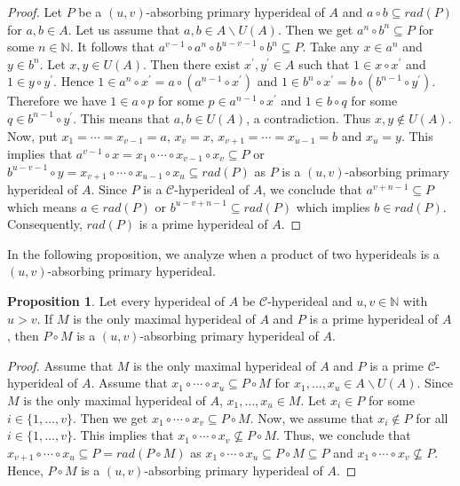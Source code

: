 \documentclass[preprint,review,10pt]{amsart}
\theoremstyle{definition}
\newtheorem{proposition}[theorem]{Proposition}
\theoremstyle{remark}
\numberwithin{equation}{section}
\begin{document}
\begin{proof}
Let $P$ be a $(u,v)$-absorbing primary hyperideal of $A$ and $a \circ b \subseteq rad(P)$ for $a,b \in A$. Let us assume that $a,b \in A\backslash U(A)$. Then we get $a^n \circ b^n \subseteq P$ for some $n \in \mathbb{N}$. It follows that  $a^{v-1} \circ a^n \circ b^{u-v-1} \circ b^n \subseteq P$. Take any $x \in a^n$ and $y \in b^n$. Let $x, y \in U(A)$. Then there exist $x^{\prime}, y^{\prime} \in A$ such that $1 \in x \circ x^{\prime}$ and $1 \in y \circ y^{\prime}$. Hence $1 \in a^n \circ x^{\prime}=a \circ (a^{n-1} \circ x^{\prime})$ and $1 \in b^n \circ x^{\prime}=b \circ (b^{n-1} \circ y^{\prime})$. Therefore we  have $1 \in a \circ p$ for some $p \in a^{n-1} \circ x^{\prime}$ and $1 \in b \circ q$ for some $q \in b^{n-1} \circ y^{\prime}$. This means that $a,b \in U(A)$, a contradiction.  Thus $x,y \notin U(A)$. Now, put $x_1=\cdots=x_{v-1}=a$, $x_v=x$, $x_{v+1}=\cdots=x_{u-1}=b$ and $x_u=y$. This implies that $a^{v-1} \circ x=x_1 \circ \cdots \circ x_{v-1} \circ x_v \subseteq P$ or $b^{u-v-1} \circ y=x_{v+1} \circ \cdots \circ x_{u-1} \circ x_u \subseteq rad(P)$ as $P$ is a $(u,v)$-absorbing primary hyperideal of $A$. Since $P$ is a $\mathcal{C}$-hyperideal of $A$,  we conclude that $a^{v+n-1} \subseteq P$ which means $a \in rad(P)$ or $b^{u-v+n-1} \subseteq rad(P)$ which implies $b \in rad(P)$. Consequently, $rad(P)$ is a prime hyperideal of $A$.
\end{proof}
In the following proposition, we analyze when a product of two hyperideals is a $(u,v)$-absorbing primary hyperideal.
\begin{proposition} \label{2}
Let every hyperideal of $A$ be $\mathcal{C}$-hyperideal and $u,v \in \mathbb{N}$ with $u >v$. If $M$ is the only maximal hyperideal of $A$ and $P$ is a prime hyperideal of $A$, then $P \circ M $ is a $(u,v)$-absorbing primary hyperideal of $A$. 
\end{proposition}
\begin{proof}
Assume that $M$ is the only maximal hyperideal of $A$ and $P$ is  a prime $\mathcal{C}$-hyperideal of $A$. Assume that $x_1 \circ \cdots \circ x_u \subseteq P \circ M$ for $x_1,\ldots,x_u \in A \backslash U(A)$. Since $M$ is the only maximal hyperideal of $A$, $x_1,\ldots,x_u \in M$. Let $x_i \in P$ for some $i \in \{1,\ldots,v\}$. Then we get $x_1 \circ \cdots \circ x_v \subseteq P \circ M$. Now, we assume that $x_i \notin P$ for all $i \in \{1,\ldots,v\}$. This implies that $x_1 \circ \cdots \circ x_v \nsubseteq P \circ M$. Thus, we conclude that $x_{v+1} \circ \cdots \circ x_u \subseteq P =rad(P\circ M)$ as  $x_1 \circ \cdots \circ x_u \subseteq P \circ M \subseteq P$ and $x_1 \circ \cdots \circ x_v \nsubseteq P$. Hence, $P \circ M $ is a $(u,v)$-absorbing primary hyperideal of $A$. 
\end{proof}
\end{document}

